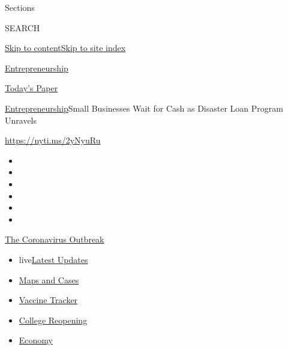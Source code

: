 Sections

SEARCH

\protect\hyperlink{site-content}{Skip to
content}\protect\hyperlink{site-index}{Skip to site index}

\href{https://www.nytimes3xbfgragh.onion/section/business/smallbusiness}{Entrepreneurship}

\href{https://myaccount.nytimes3xbfgragh.onion/auth/login?response_type=cookie\&client_id=vi}{}

\href{https://www.nytimes3xbfgragh.onion/section/todayspaper}{Today's
Paper}

\href{/section/business/smallbusiness}{Entrepreneurship}\textbar{}Small
Businesses Wait for Cash as Disaster Loan Program Unravels

\url{https://nyti.ms/2yNyuRu}

\begin{itemize}
\item
\item
\item
\item
\item
\item
\end{itemize}

\href{https://www.nytimes3xbfgragh.onion/news-event/coronavirus?action=click\&pgtype=Article\&state=default\&region=TOP_BANNER\&context=storylines_menu}{The
Coronavirus Outbreak}

\begin{itemize}
\tightlist
\item
  live\href{https://www.nytimes3xbfgragh.onion/2020/08/03/world/coronavirus-covid-19.html?action=click\&pgtype=Article\&state=default\&region=TOP_BANNER\&context=storylines_menu}{Latest
  Updates}
\item
  \href{https://www.nytimes3xbfgragh.onion/interactive/2020/us/coronavirus-us-cases.html?action=click\&pgtype=Article\&state=default\&region=TOP_BANNER\&context=storylines_menu}{Maps
  and Cases}
\item
  \href{https://www.nytimes3xbfgragh.onion/interactive/2020/science/coronavirus-vaccine-tracker.html?action=click\&pgtype=Article\&state=default\&region=TOP_BANNER\&context=storylines_menu}{Vaccine
  Tracker}
\item
  \href{https://www.nytimes3xbfgragh.onion/2020/08/02/us/covid-college-reopening.html?action=click\&pgtype=Article\&state=default\&region=TOP_BANNER\&context=storylines_menu}{College
  Reopening}
\item
  \href{https://www.nytimes3xbfgragh.onion/live/2020/08/03/business/stock-market-today-coronavirus?action=click\&pgtype=Article\&state=default\&region=TOP_BANNER\&context=storylines_menu}{Economy}
\end{itemize}

